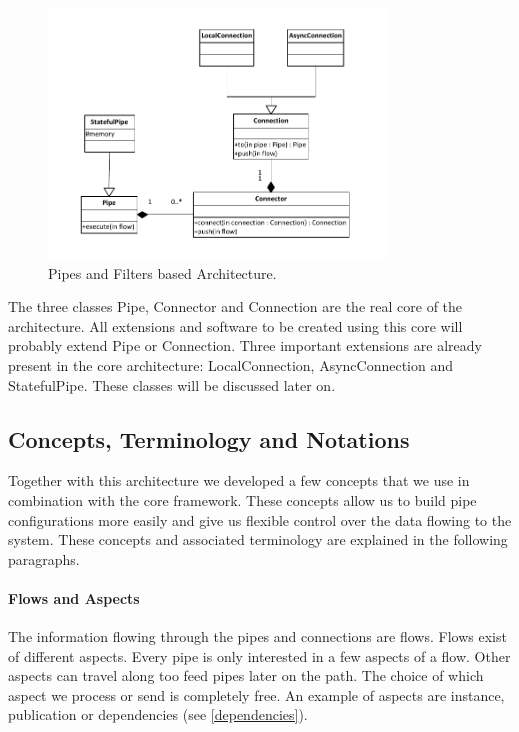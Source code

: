 \begin{figure}[htp]
	\centering
		\includegraphics[width=0.8\textwidth]{fig/architecturev2}
	\caption{Pipes and Filters based Architecture.}
	\label{fig:architecturev2}
\end{figure}

The three classes Pipe, Connector and Connection are the real core of the architecture. All extensions and software to be created using this core will probably extend Pipe or Connection. Three important extensions are already present in the core architecture: LocalConnection, AsyncConnection and StatefulPipe. These classes will be discussed later on.

\subsection{Concepts, Terminology and Notations}

Together with this architecture we developed a few concepts that we use in combination with the core framework. These concepts allow us to build pipe configurations more easily and give us flexible control over the data flowing to the system. These concepts and associated terminology are explained in the following paragraphs.

\paragraph{Flows and Aspects} The information flowing through the pipes and connections are flows. Flows exist of different aspects. Every pipe is only interested in a few aspects of a flow. Other aspects can travel along too feed pipes later on the path. The choice of which aspect we process or send is completely free. An example of aspects are instance, publication or dependencies (see \autoref{dependencies}).

